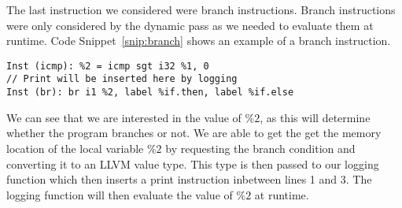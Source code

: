 The last instruction we considered were branch instructions\cite{branchinstruction}. Branch instructions were only considered by the dynamic pass as we needed to evaluate them at runtime. Code Snippet~\ref{snip:branch} shows an example of a branch instruction. 
\vspace{-0.3cm}

\begin{lstlisting}[escapechar=@, caption={Branch Instruction}, label=snip:branch]
Inst (icmp): %2 = icmp sgt i32 %1, 0
// Print will be inserted here by logging
Inst (br): br i1 %2, label %if.then, label %if.else
\end{lstlisting}

 We can see that we are interested in the value of $\%2$, as this will determine whether the program branches or not. We are able to get the get the memory location of the local variable $\%2$ by requesting the branch condition and converting it to an LLVM value type. This type is then passed to our logging function which then inserts a print instruction inbetween lines 1 and 3. The logging function will then evaluate the value of $\%2$ at runtime.




